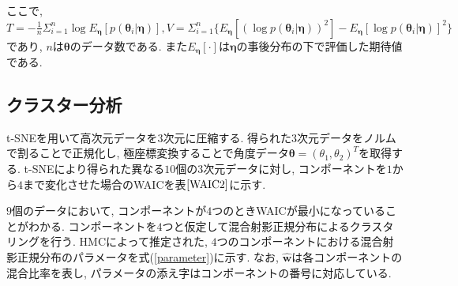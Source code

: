 \documentclass[a4j,12pt]{jarticle}
\begin{document}
\noindent
ここで, $T = - \frac{1}{n} \Sigma^n_{i=1} \log E_{\bm \eta}[p(\bm \theta_i| \bm \eta)], 
V = \Sigma^n_{i=1} \{ E_{\bm \eta}[(\log p(\bm \theta_i| \bm \eta))^2] - E_{\bm \eta}[\log p(\bm \theta_i| \bm \eta)]^2 \}$であり, $n$は$\bm \theta$のデータ数である. また$E_{\bm \eta}[\cdot]$は$\bm \eta$の事後分布の下で評価した期待値である.  

\subsection{クラスター分析}

t-SNEを用いて高次元データを$3$次元に圧縮する. 得られた$3$次元データをノルムで割ることで正規化し, 極座標変換することで角度データ$\bm \theta = (\theta_1, \theta_2)^T$を取得する. t-SNEにより得られた異なる$10$個の$3$次元データに対し, コンポーネントを$1$から$4$まで変化させた場合のWAICを表$\ref{WAIC2}$に示す. 


\begin{table}[tbp]
\caption{WAICによるコンポーネントの選択結果}
\label{WAIC2}
\begin{center}
\end{center}
\end{table}


\noindent
$9$個のデータにおいて, コンポーネントが$4$つのときWAICが最小になっていることがわかる. コンポーネントを$4$つと仮定して混合射影正規分布によるクラスタリングを行う. HMCによって推定された, $4$つのコンポーネントにおける混合射影正規分布のパラメータを式(\ref{parameter})に示す. なお, $\hat {\bm w}$は各コンポーネントの混合比率を表し, パラメータの添え字はコンポーネントの番号に対応している.
\end{document}
